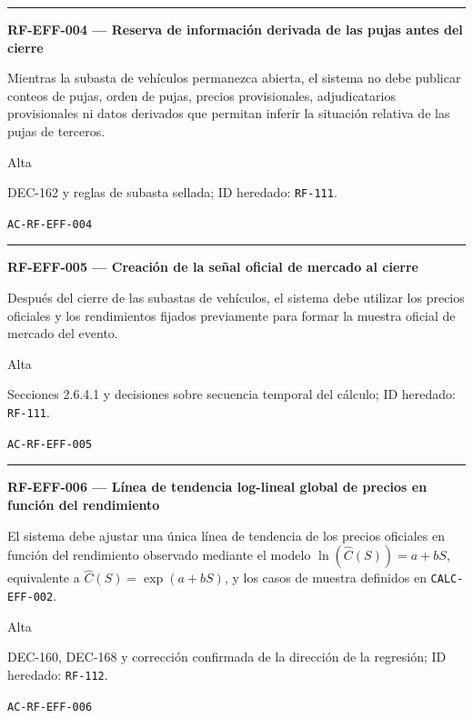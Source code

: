 \documentclass[10pt,letterpaper]{article}
\begin{document}
\vspace{0.25em}\hrule\vspace{0.65em}
\noindent\textbf{RF-EFF-004 --- Reserva de información derivada de las pujas antes del cierre}\par
\begin{description}[style=nextline,leftmargin=3.15cm,labelwidth=2.8cm,font=\normalfont\bfseries]
\item[Obligación] Mientras la subasta de vehículos permanezca abierta, el sistema no debe publicar conteos de pujas, orden de pujas, precios provisionales, adjudicatarios provisionales ni datos derivados que permitan inferir la situación relativa de las pujas de terceros.
\item[Prioridad] Alta
\item[Procedencia] DEC-162 y reglas de subasta sellada; ID heredado: \texttt{RF-111}.
\item[Verificación] \texttt{AC-RF-EFF-004}
\end{description}
\vspace{0.25em}\hrule\vspace{0.65em}
\noindent\textbf{RF-EFF-005 --- Creación de la señal oficial de mercado al cierre}\par
\begin{description}[style=nextline,leftmargin=3.15cm,labelwidth=2.8cm,font=\normalfont\bfseries]
\item[Obligación] Después del cierre de las subastas de vehículos, el sistema debe utilizar los precios oficiales y los rendimientos fijados previamente para formar la muestra oficial de mercado del evento.
\item[Prioridad] Alta
\item[Procedencia] Secciones 2.6.4.1 y decisiones sobre secuencia temporal del cálculo; ID heredado: \texttt{RF-111}.
\item[Verificación] \texttt{AC-RF-EFF-005}
\end{description}
\vspace{0.25em}\hrule\vspace{0.65em}
\noindent\textbf{RF-EFF-006 --- Línea de tendencia log-lineal global de precios en función del rendimiento}\par
\begin{description}[style=nextline,leftmargin=3.15cm,labelwidth=2.8cm,font=\normalfont\bfseries]
\item[Obligación] El sistema debe ajustar una única línea de tendencia de los precios oficiales en función del rendimiento observado mediante el modelo $\ln(\widehat{C}(S))=a+bS$, equivalente a $\widehat{C}(S)=\exp(a+bS)$, y los casos de muestra definidos en \texttt{CALC-EFF-002}.
\item[Prioridad] Alta
\item[Procedencia] DEC-160, DEC-168 y corrección confirmada de la dirección de la regresión; ID heredado: \texttt{RF-112}.
\item[Verificación] \texttt{AC-RF-EFF-006}
\end{description}
\end{document}
